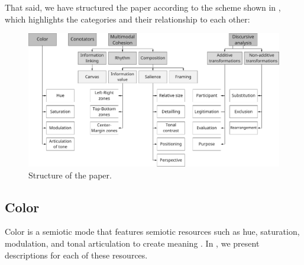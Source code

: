 \documentclass[english]{textolivre}
\begin{document}
That said, we have structured the paper according to the scheme shown in , which highlights the categories and their relationship to each other:

\begin{figure}[htbp]
 \centering
 \begin{minipage}{.85\textwidth}
 \includegraphics[width=\textwidth]{Fig-1.pdf}
 \caption{Structure of the paper.}
 \label{fig01}
 \end{minipage}
\end{figure}

\subsection{Color}\label{sec-formato}
Color is a semiotic mode that features semiotic resources such as hue, saturation, modulation, and tonal articulation to create meaning \cite[p. 167]{van_leeuwen_introducing_2005}. In , we present descriptions for each of these resources.
\end{document}
